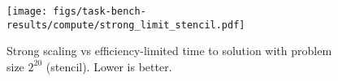 \begin{figure}[t]
\centering
\texttt{[image: figs/task-bench-results/compute/strong\_limit\_stencil.pdf]}
\vspace{-0.6cm}
\caption{Strong scaling vs efficiency-limited time to solution with problem size $2^{20}$ (stencil). Lower is better.\label{fig:strong-scaling}}
\vspace{-0.35cm}
\end{figure}
